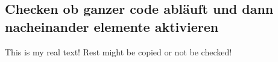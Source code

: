 \subsection{Checken ob ganzer code abläuft und dann nacheinander elemente aktivieren} \label{subsection:evaluation-modifications-flow}
This is my real text! Rest might be copied or not be checked!

